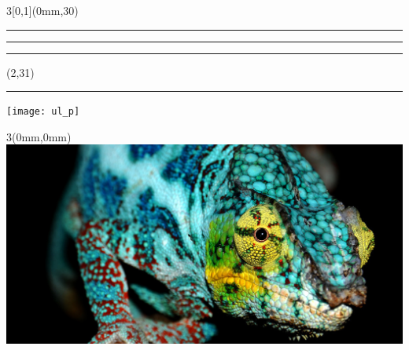 \begingroup

\textblockorigin{0mm}{0mm}
\setlength{\parindent}{0mm}
\setlength{\banderougewidth}{2\TPHorizModule}
\setlength{\banderougeheight}{\TPVertModule}
\setlength{\bandeorwidth}{\TPHorizModule}
\setlength{\bandeorheight}{\banderougeheight}
\setlength{\imageheight}{29\TPVertModule}
\setlength{\imagewidth}{3\TPHorizModule}
\setlength{\logoheight}{2.5\TPVertModule}
\setlength{\gapwidth}{0.75pt}
\addtolength{\bandeorwidth}{-\gapwidth}
\addtolength{\imageheight}{-\gapwidth}

\begin{frame}[plain]
  \begin{textblock*}{3\TPHorizModule}[0,1](0mm,30\TPVertModule)
    \textcolor{rouge}{\rule{\banderougewidth}{\banderougeheight}}%
    \rule{\gapwidth}{0pt}%
    \textcolor{or}{\rule{\bandeorwidth}{\bandeorheight}}           %
  \end{textblock*}

  \begin{textblock*}{\TPHorizModule}(2\TPHorizModule,31\TPVertModule)
    \rule{\gapwidth}{0pt}%
    \texttt{[image: ul\_p]}
  \end{textblock*}

  \begin{textblock*}{3\TPHorizModule}(0mm,0mm)
    \includegraphics[height=\imageheight,width=\imagewidth]{furcifer-pardalis-nosy-faly}
  \end{textblock*}


\end{frame}
